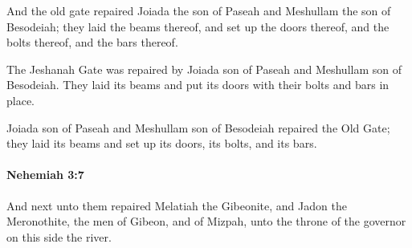 			\begin{versebox}
					\item[BHS] 
					\item[LXX] 
					\item[ASV] And the old gate repaired Joiada the son of Paseah and Meshullam the son of Besodeiah; they laid the beams thereof, and set up the doors thereof, and the bolts thereof, and the bars thereof.
					\item[NIV] The Jeshanah Gate was repaired by Joiada son of Paseah and Meshullam son of Besodeiah. They laid its beams and put its doors with their bolts and bars in place.
					\item[NRSV] Joiada son of Paseah and Meshullam son of Besodeiah repaired the Old Gate; they laid its beams and set up its doors, its bolts, and its bars.
			\end{versebox}

		\paragraph{Nehemiah 3:7} %
			\label{NEHEMIAH-3-7}

			And next unto them repaired Melatiah the Gibeonite, and Jadon the Meronothite, the men of Gibeon, and of Mizpah, unto the throne of the governor on this side the river.

